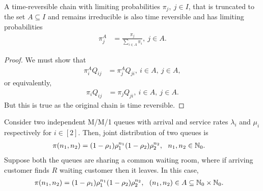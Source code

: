 \documentclass[a4paper,10pt,english]{article}
\begin{document}
\begin{prop}
A time-reversible chain with limiting probabilities $\pi_j,~ j \in I$, that is truncated to the set $A\subseteq I$ and remains irreducible is also time reversible and has limiting probabilities 
\begin{align*}
\pi_j^A&=\frac{\pi_j}{\sum_{i \in A}\pi_i},~ j \in A.
\end{align*}
\end{prop}
\begin{proof}
We must show that 
\begin{align*}
\pi_i^AQ_{ij}&=\pi_j^AQ_{ji},~ i \in A,~ j \in A,
\end{align*}
or equivalently,
\begin{align*} 
\pi_iQ_{ij}&=\pi_jQ_{ji},~ i \in A,~ j \in A.
\end{align*}
But this is true as the original chain is time reversible.
\end{proof}
\begin{shaded*}
\begin{exmp*} Consider two independent M/M/1 queues with arrival and service rates $\lambda_i$ and $\mu_i$ respectively for $i \in [2]$. Then, joint distribution of two queues is
\begin{align*}
\pi(n_1,n_2) &= (1 -\rho_1)\rho_1^{n_1}(1-\rho_2)\rho_2^{n_2},~~n_1,n_2 \in \mathbb{N}_0. 
\end{align*}
Suppose both the queues are sharing a common waiting room, where if arriving customer finds $R$ waiting customer then it leaves. In this case,
\begin{align*}
\pi(n_1,n_2) &= (1 -\rho_1)\rho_1^{n_1}(1-\rho_2)\rho_2^{n_2},~~(n_1,n_2) \in A \subseteq \mathbb{N}_0\times\mathbb{N}_0. 
\end{align*}
\end{exmp*}
\end{shaded*}
\end{document}
